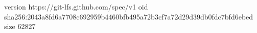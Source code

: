 version https://git-lfs.github.com/spec/v1
oid sha256:2043a8fd6a7708c692959b4460bfb495a72b3cf7a72d29d39db0fdc7bfd6ebed
size 62827
